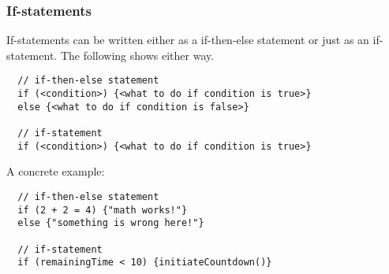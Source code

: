 \subsubsection{If-statements}
\label{subsec:ifStatements}

If-statements can be written either as a if-then-else statement or just as an if-statement. The following shows either way.

\begin{verbatim}
  // if-then-else statement
  if (<condition>) {<what to do if condition is true>}
  else {<what to do if condition is false>}

  // if-statement
  if (<condition>) {<what to do if condition is true>}
\end{verbatim}

A concrete example:

\begin{verbatim}
  // if-then-else statement
  if (2 + 2 = 4) {"math works!"}
  else {"something is wrong here!"}

  // if-statement
  if (remainingTime < 10) {initiateCountdown()}
\end{verbatim}
